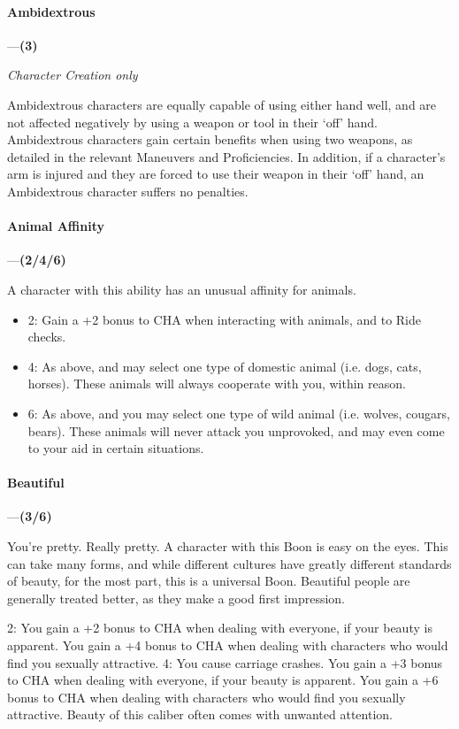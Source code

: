 \documentclass[oneside,11pt,english]{book}
\begin{document}
\paragraph{\label{boon:Ambidextrous}Ambidextrous}---\quad \textbf{(3)}\par
\textit{Character Creation only}\par
Ambidextrous characters are equally capable of using either hand well, and are not affected negatively by 
using a weapon or tool in their ‘off’ hand. Ambidextrous characters gain certain benefits when using two 
weapons, as detailed in the relevant Maneuvers and Proficiencies. In addition, if a character's arm is 
injured and they are forced to use their weapon in their ‘off’ hand, an Ambidextrous character suffers no 
penalties. 
\paragraph{\label{boon:Animal Affinity}Animal Affinity}\!---\quad \textbf{(2/4/6)}\par
A character with this ability has an unusual affinity for animals. 
\begin{itemize}
	\item 2: Gain a +2 bonus to CHA when interacting with animals, and to Ride checks. 
	\item 4: As above, and may select one type of domestic animal (i.e. dogs, cats, horses). These animals will always cooperate with you, within reason. 
	\item 6: As above, and you may select one type of wild animal (i.e. wolves, cougars, bears). These animals will never attack you unprovoked, and may even come to your aid in certain situations. 
\end{itemize}

\paragraph{\label{boon:Beautiful}Beautiful}---\quad \textbf{(3/6)}\par
You're pretty. Really pretty. A character with this Boon is easy on the eyes. This can take many forms, 
and while different cultures have greatly different standards of beauty, for the most part, this is a universal 
Boon. Beautiful people are generally treated better, as they make a good first impression. 

 

2: You gain a +2 bonus to CHA when dealing with everyone, if your beauty is apparent. You gain a +4 
bonus to CHA when dealing with characters who would find you sexually attractive. 
4: You cause carriage crashes. You gain a +3 bonus to CHA when dealing with everyone, if your beauty 
is apparent. You gain a +6 bonus to CHA when dealing with characters who would find you sexually 
attractive. Beauty of this caliber often comes with unwanted attention. 
\end{document}
